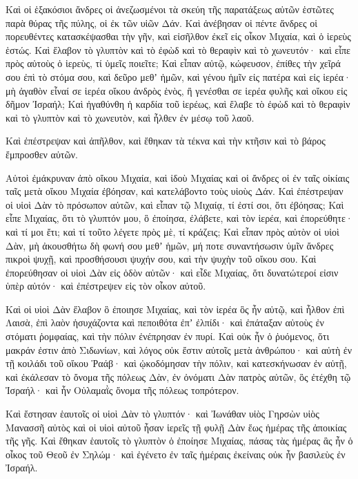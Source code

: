 {Καὶ οἱ ἑξακόσιοι ἄνδρες οἱ ἀνεζωσμένοι τὰ σκεύη τῆς παρατάξεως αὐτῶν ἑστῶτες παρὰ θύρας τῆς πύλης, οἱ ἐκ τῶν υἱῶν Δάν.
Καὶ ἀνέβησαν οἱ πέντε ἄνδρες οἱ πορευθέντες κατασκέψασθαι τὴν γῆν,
καὶ εἰσῆλθον ἐκεῖ εἰς οἶκον Μιχαία, καὶ ὁ ἱερεὺς ἑστώς. Καὶ ἔλαβον τὸ γλυπτὸν καὶ τὸ ἐφὼδ καὶ τὸ θεραφὶν καὶ τὸ χωνευτόν· καὶ εἶπε πρὸς αὐτοὺς ὁ ἱερεὺς, τί ὑμεῖς ποιεῖτε;
Καὶ εἶπαν αὐτῷ, κώφευσον, ἐπίθες τὴν χεῖρά σου ἐπὶ τὸ στόμα σου, καὶ δεῦρο μεθʼ ἡμῶν, καὶ γένου ἡμῖν εἰς πατέρα καὶ εἰς ἱερέα· μὴ ἀγαθὸν εἶναί σε ἱερέα οἴκου ἀνδρὸς ἑνὸς, ἢ γενέσθαι σε ἱερέα φυλῆς καὶ οἴκου εἰς δῆμον Ἰσραήλ;
Καὶ ἠγαθύνθη ἡ καρδία τοῦ ἱερέως, καὶ ἔλαβε τὸ ἐφὼδ καὶ τὸ θεραφὶν καὶ τὸ γλυπτὸν καὶ τὸ χωνευτὸν, καὶ ἦλθεν ἐν μέσῳ τοῦ λαοῦ.
\par }{\PP {}Καὶ ἐπέστρεψαν καὶ ἀπῆλθον, καὶ ἔθηκαν τὰ τέκνα καὶ τὴν κτῆσιν καὶ τὸ βάρος ἔμπροσθεν αὐτῶν.
\par }{\PP {}Αὐτοὶ ἐμάκρυναν ἀπὸ οἴκου Μιχαία, καὶ ἰδοὺ Μιχαίας καὶ οἱ ἄνδρες οἱ ἐν ταῖς οἰκίαις ταῖς μετὰ οἴκου Μιχαία ἐβόησαν, καὶ κατελάβοντο τοὺς υἱοὺς Δάν.
Καὶ ἐπέστρεψαν οἱ υἱοὶ Δὰν τὸ πρόσωπον αὐτῶν, καὶ εἶπαν τῷ Μιχαίᾳ, τί ἐστί σοι, ὅτι ἐβόησας;
Καὶ εἶπε Μιχαίας, ὅτι τὸ γλυπτόν μου, ὃ ἐποίησα, ἐλάβετε, καὶ τὸν ἱερέα, καὶ ἐπορεύθητε· καὶ τί μοι ἔτι; καὶ τί τοῦτο λέγετε πρὸς μὲ, τί κράζεις;
Καὶ εἶπαν πρὸς αὐτὸν οἱ υἱοὶ Δὰν, μὴ ἀκουσθήτω δὴ φωνή σου μεθʼ ἡμῶν, μή ποτε συναντήσωσιν ὑμῖν ἄνδρες πικροὶ ψυχῇ, καὶ προσθήσουσι ψυχήν σου, καὶ τὴν ψυχὴν τοῦ οἴκου σου.
Καὶ ἐπορεύθησαν οἱ υἱοὶ Δὰν εἰς ὁδὸν αὐτῶν· καὶ εἶδε Μιχαίας, ὅτι δυνατώτεροί εἰσιν ὑπὲρ αὐτόν· καὶ ἐπέστρεψεν εἰς τὸν οἶκον αὐτοῦ.
\par }{\PP {}Καὶ οἱ υἱοὶ Δὰν ἔλαβον ὃ ἐποιησε Μιχαίας, καὶ τὸν ἱερέα ὃς ἦν αὐτῷ, καὶ ἦλθον ἐπὶ Λαισὰ, ἐπὶ λαὸν ἡσυχάζοντα καὶ πεποιθότα ἐπʼ ἐλπίδι· καὶ ἐπάταξαν αὐτοὺς ἐν στόματι ῥομφαίας, καὶ τὴν πόλιν ἐνέπρησαν ἐν πυρί.
Καὶ οὐκ ἦν ὁ ῥυόμενος, ὅτι μακράν ἐστιν ἀπὸ Σιδωνίων, καὶ λόγος οὐκ ἔστιν αὐτοῖς μετὰ ἀνθρώπου· καὶ αὐτὴ ἐν τῇ κοιλάδι τοῦ οἴκου Ῥαάβ· καὶ ᾠκοδόμησαν τὴν πόλιν, καὶ κατεσκήνωσαν ἐν αὐτῇ,
καὶ ἐκάλεσαν τὸ ὄνομα τῆς πόλεως Δὰν, ἐν ὀνόματι Δὰν πατρὸς αὐτῶν, ὃς ἐτέχθη τῷ Ἰσραήλ· καὶ ἦν Οὐλαμαῒς ὄνομα τῆς πόλεως τοπρότερον.
\par }{\PP {}Καὶ ἔστησαν ἑαυτοῖς οἱ υἱοὶ Δὰν τὸ γλυπτόν· καὶ Ἰωνάθαν υἱὸς Γηρσὼν υἱὸς Μανασσῆ αὐτὸς καὶ οἱ υἱοὶ αὐτοῦ ἦσαν ἱερεῖς τῇ φυλῇ Δὰν ἕως ἡμέρας τῆς ἀποικίας τῆς γῆς.
Καὶ ἔθηκαν ἑαυτοῖς τὸ γλυπτὸν ὁ ἐποίησε Μιχαίας, πάσας τὰς ἡμέρας ἃς ἦν ὁ οἶκος τοῦ Θεοῦ ἐν Σηλώμ· καὶ ἐγένετο ἐν ταῖς ἡμέραις ἐκείναις οὐκ ἦν βασιλεὺς ἐν Ἰσραήλ.

}
